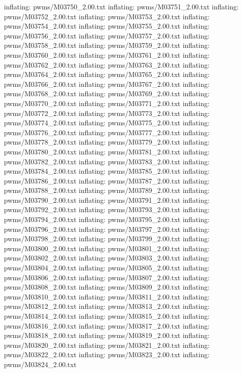 \documentclass[letterpaper,10pt,english]{sphinxmanual}
\begin{document}
{\begin{sphinxVerbatim}[commandchars=\\\{\}]
  inflating: pwms/M03750\_2.00.txt
  inflating: pwms/M03751\_2.00.txt
  inflating: pwms/M03752\_2.00.txt
  inflating: pwms/M03753\_2.00.txt
  inflating: pwms/M03754\_2.00.txt
  inflating: pwms/M03755\_2.00.txt
  inflating: pwms/M03756\_2.00.txt
  inflating: pwms/M03757\_2.00.txt
  inflating: pwms/M03758\_2.00.txt
  inflating: pwms/M03759\_2.00.txt
  inflating: pwms/M03760\_2.00.txt
  inflating: pwms/M03761\_2.00.txt
  inflating: pwms/M03762\_2.00.txt
  inflating: pwms/M03763\_2.00.txt
  inflating: pwms/M03764\_2.00.txt
  inflating: pwms/M03765\_2.00.txt
  inflating: pwms/M03766\_2.00.txt
  inflating: pwms/M03767\_2.00.txt
  inflating: pwms/M03768\_2.00.txt
  inflating: pwms/M03769\_2.00.txt
  inflating: pwms/M03770\_2.00.txt
  inflating: pwms/M03771\_2.00.txt
  inflating: pwms/M03772\_2.00.txt
  inflating: pwms/M03773\_2.00.txt
  inflating: pwms/M03774\_2.00.txt
  inflating: pwms/M03775\_2.00.txt
  inflating: pwms/M03776\_2.00.txt
  inflating: pwms/M03777\_2.00.txt
  inflating: pwms/M03778\_2.00.txt
  inflating: pwms/M03779\_2.00.txt
  inflating: pwms/M03780\_2.00.txt
  inflating: pwms/M03781\_2.00.txt
  inflating: pwms/M03782\_2.00.txt
  inflating: pwms/M03783\_2.00.txt
  inflating: pwms/M03784\_2.00.txt
  inflating: pwms/M03785\_2.00.txt
  inflating: pwms/M03786\_2.00.txt
  inflating: pwms/M03787\_2.00.txt
  inflating: pwms/M03788\_2.00.txt
  inflating: pwms/M03789\_2.00.txt
  inflating: pwms/M03790\_2.00.txt
  inflating: pwms/M03791\_2.00.txt
  inflating: pwms/M03792\_2.00.txt
  inflating: pwms/M03793\_2.00.txt
  inflating: pwms/M03794\_2.00.txt
  inflating: pwms/M03795\_2.00.txt
  inflating: pwms/M03796\_2.00.txt
  inflating: pwms/M03797\_2.00.txt
  inflating: pwms/M03798\_2.00.txt
  inflating: pwms/M03799\_2.00.txt
  inflating: pwms/M03800\_2.00.txt
  inflating: pwms/M03801\_2.00.txt
  inflating: pwms/M03802\_2.00.txt
  inflating: pwms/M03803\_2.00.txt
  inflating: pwms/M03804\_2.00.txt
  inflating: pwms/M03805\_2.00.txt
  inflating: pwms/M03806\_2.00.txt
  inflating: pwms/M03807\_2.00.txt
  inflating: pwms/M03808\_2.00.txt
  inflating: pwms/M03809\_2.00.txt
  inflating: pwms/M03810\_2.00.txt
  inflating: pwms/M03811\_2.00.txt
  inflating: pwms/M03812\_2.00.txt
  inflating: pwms/M03813\_2.00.txt
  inflating: pwms/M03814\_2.00.txt
  inflating: pwms/M03815\_2.00.txt
  inflating: pwms/M03816\_2.00.txt
  inflating: pwms/M03817\_2.00.txt
  inflating: pwms/M03818\_2.00.txt
  inflating: pwms/M03819\_2.00.txt
  inflating: pwms/M03820\_2.00.txt
  inflating: pwms/M03821\_2.00.txt
  inflating: pwms/M03822\_2.00.txt
  inflating: pwms/M03823\_2.00.txt
  inflating: pwms/M03824\_2.00.txt

\end{sphinxVerbatim}}
\end{document}
